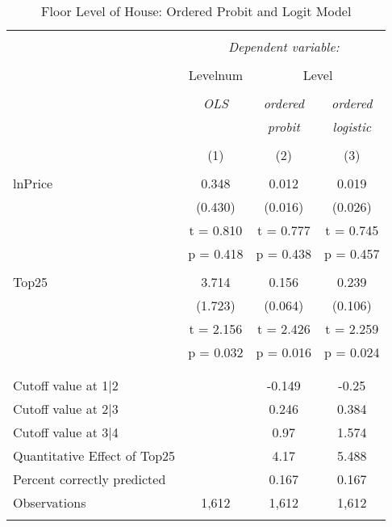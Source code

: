 \documentclass[
  12pt,
]{article}
\begin{document}
\begin{table}[t] \centering 
  \caption{Floor Level of House: Ordered Probit and Logit Model} 
  \label{housing} 
\begin{tabular}{@{\extracolsep{5pt}}lccc} 
\\[-1.8ex]\hline 
\hline \\[-1.8ex] 
 & \multicolumn{3}{c}{\textit{Dependent variable:}} \\ 
\cline{2-4} 
\\[-1.8ex] & Levelnum & \multicolumn{2}{c}{Level} \\ 
\\[-1.8ex] & \textit{OLS} & \textit{ordered} & \textit{ordered} \\ 
 & \textit{} & \textit{probit} & \textit{logistic} \\ 
\\[-1.8ex] & (1) & (2) & (3)\\ 
\hline \\[-1.8ex] 
 lnPrice & 0.348 & 0.012 & 0.019 \\ 
  & (0.430) & (0.016) & (0.026) \\ 
  & t = 0.810 & t = 0.777 & t = 0.745 \\ 
  & p = 0.418 & p = 0.438 & p = 0.457 \\ 
  & & & \\ 
 Top25 & 3.714 & 0.156 & 0.239 \\ 
  & (1.723) & (0.064) & (0.106) \\ 
  & t = 2.156 & t = 2.426 & t = 2.259 \\ 
  & p = 0.032 & p = 0.016 & p = 0.024 \\ 
  & & & \\ 
\hline \\[-1.8ex] 
Cutoff value at 1|2 &  & -0.149 & -0.25 \\ 
Cutoff value at 2|3 &  & 0.246 & 0.384 \\ 
Cutoff value at 3|4 &  & 0.97 & 1.574 \\ 
Quantitative Effect of Top25 &  & 4.17 & 5.488 \\ 
Percent correctly predicted &  & 0.167 & 0.167 \\ 
Observations & 1,612 & 1,612 & 1,612 \\ 
\hline 
\hline \\[-1.8ex] 
\end{tabular} 
\end{table}
\end{document}
